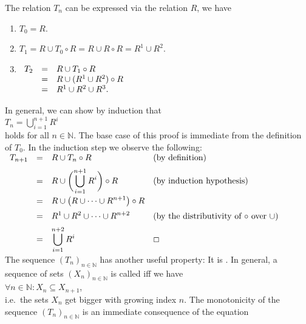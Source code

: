 The relation  $T_n$ can be expressed via the relation $R$, we have
\begin{enumerate}
\item $T_0 = R$.
\item $T_1 = R \cup T_0 \circ R = R \cup R \circ R = R^1 \cup R^2$.
\item$\begin{array}[t]{lcl}
       T_2  & = & R \cup T_1 \circ R \\
            & = & R \cup (R^1 \cup R^2) \circ R \\
            & = & R^1 \cup R^2 \cup R^3. \\
       \end{array}
      $
\end{enumerate}
In general, we can show by induction that
\\[0.2cm]
\hspace*{1.3cm}
$T_n = \bigcup\limits_{i=1}^{n+1} R^i$
\\[0.2cm]
holds for all $n \in \mathbb{N}$.  The base case of this proof is immediate from the definition of $T_0$.
In the induction step we observe the following:
\\[0.2cm]
\hspace*{1.3cm}
$
 \begin{array}{lcll}
   T_{n+1} & = & \displaystyle R \cup T_n \circ R & \mbox{(by definition)} \\[0.2cm]
           & = & \displaystyle R \cup \biggl(\bigcup\limits_{i=1}^{n+1} R^i\biggr) \circ R &
                 \mbox{(by induction hypothesis)} \\[0.4cm]
           & = & \displaystyle R \cup \left(R \cup \cdots \cup R^{n+1}\right) \circ R \\[0.2cm] 
           & = & \displaystyle R^1 \cup R^2 \cup \cdots \cup R^{n+2}  &
                 \mbox{(by the distributivity of $\circ$ over $\cup$)} \\[0.2cm]
           & = & \displaystyle \bigcup\limits_{i=1}^{n+2} R^i & \Box 
   \end{array}
$
\\[0.2cm]
The sequence $(T_n)_{n\in\mathbb{N}}$ has another useful property:  It is 
.  In general, a sequence of sets $(X_n)_{n\in\mathbb{N}}$ is called
 iff we have
\\[0.2cm]
\hspace*{1.3cm}
$\forall n \in \mathbb{N}: X_n \subseteq X_{n+1}$,
\\[0.2cm]
i.e.~the sets $X_n$ get bigger with growing index $n$.
The monotonicity of the sequence  $(T_n)_{n \in \mathbb{N}}$ is an immediate consequence of the equation

